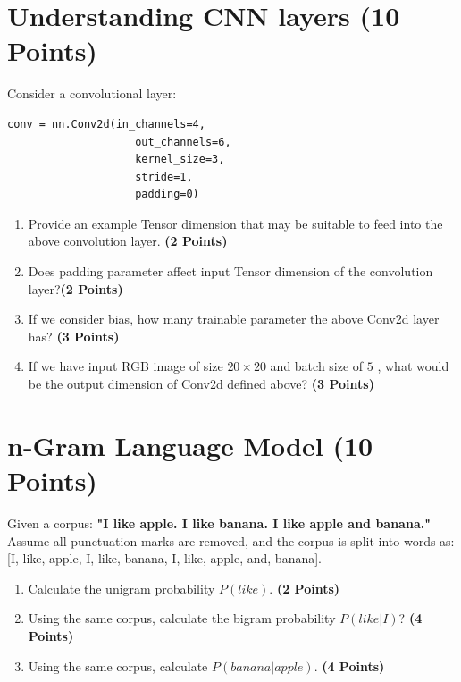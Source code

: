 \documentclass[12pt, xcolor=dvipsnames,svgnames,x11names]{article}
\begin{document}
\section{Understanding CNN layers \hfill \textbf{(10 Points)}}

Consider a convolutional layer:


\begin{verbatim}
conv = nn.Conv2d(in_channels=4,  
                    out_channels=6,
                    kernel_size=3,
                    stride=1,
                    padding=0)
\end{verbatim}


\begin{enumerate}
\item Provide an example Tensor dimension that may be suitable to feed into the above convolution layer. \hfill \textbf{(2 Points)}

\item Does padding parameter affect input Tensor dimension of the convolution layer?\hfill \textbf{(2 Points)} 

\item If we consider bias, how many trainable parameter the above Conv2d layer has? \hfill \textbf{(3 Points)}

\item If we have input RGB image of size $20\times 20$ and batch size of $5$ , what would be the output dimension of Conv2d defined above? \hfill \textbf{(3 Points)}


\end{enumerate}



\section{n-Gram Language Model (10 Points)}

Given a corpus: \textbf{"I like apple. I like banana. I like apple and banana."} Assume all punctuation marks are removed, and the corpus is split into words as: [I, like, apple, I, like, banana, I, like, apple, and, banana]. 

\begin{enumerate}
\item 
Calculate the unigram probability $P(like)$. \hfill \textbf{(2 Points)}
\item Using the same corpus, calculate the bigram probability $P(like | I)$?  \hfill \textbf{(4 Points)}
\item Using the same corpus, calculate $P(banana | apple)$.  \hfill \textbf{(4 Points)}
\end{enumerate} 
\end{document}
